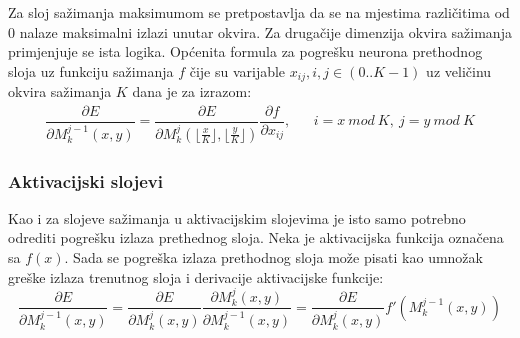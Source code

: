 \documentclass[times, utf8, zavrsni, numeric]{fer}
\begin{document}
Za sloj sažimanja maksimumom se pretpostavlja da se na mjestima različitima od 0 nalaze maksimalni izlazi unutar okvira. Za drugačije dimenzija okvira sažimanja primjenjuje se ista logika. Općenita formula za pogrešku neurona prethodnog sloja uz funkciju sažimanja $f$ čije su varijable $x_{ij}, i, j \in (0 .. K-1)$ uz veličinu okvira sažimanja $K$ dana je za izrazom:
\begin{align}\label{eq:pool-sloj-err}
\dfrac{\partial E}{\partial M^{j-1}_k (x, y)} = \dfrac{\partial E}{\partial M^j_k (\lfloor \frac{x}{K} \rfloor, \lfloor \frac{y}{K} \rfloor)} \dfrac{\partial f}{\partial x_{ij}}, && i = x\ mod\ K,\ j = y\ mod\ K
\end{align}  

\subsubsection{Aktivacijski slojevi}
Kao i za slojeve sažimanja u aktivacijskim slojevima je isto samo potrebno odrediti pogrešku izlaza prethednog sloja. Neka je aktivacijska funkcija označena sa $f(x)$. Sada se pogreška izlaza prethodnog sloja može pisati kao umnožak greške izlaza trenutnog sloja i derivacije aktivacijske funkcije:
\begin{equation}\label{eq:act-sloj-err}
\dfrac{\partial E}{\partial M^{j-1}_k (x, y)} = \dfrac{\partial E}{\partial M^j_k (x, y)} \dfrac{\partial M^j_k (x, y)}{\partial M^{j-1}_k (x, y)} = \dfrac{\partial E}{\partial M^j_k (x, y)} f'(M^{j-1}_k (x, y))
\end{equation}
\end{document}
